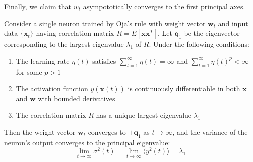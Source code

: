  Finally, we claim that $w_t$ asympototically converges to the first principal axes. 

  \begin{theorem}
    \label{thm:ojas-neuron-convergence-to-first-principal}
    Consider a single neuron trained by \hyperref[thm:ojas-rule]{Oja's rule} with weight vector $\mathbf{w}_t$ and input data $\{\mathbf{x}_t\}$ having correlation matrix $R = E[\mathbf{x}\mathbf{x}^T]$. Let $\mathbf{q}_1$ be the eigenvector corresponding to the largest eigenvalue $\lambda_1$ of $R$. Under the following conditions:
    \begin{enumerate}
      \item The learning rate $\eta(t)$ satisfies $\sum_{t=1}^{\infty} \eta(t) = \infty$ and $\sum_{t=1}^{\infty} \eta(t)^p < \infty$ for some $p > 1$
      \item The activation function $y(\mathbf{x}(t))$ is \hyperref[mv-def:continuously-differentiable]{continuously differentiable} in both $\mathbf{x}$ and $\mathbf{w}$ with bounded derivatives
      \item The correlation matrix $R$ has a unique largest eigenvalue $\lambda_1$
    \end{enumerate}
    Then the weight vector $\mathbf{w}_t$ converges to $\pm\mathbf{q}_1$ as $t \to \infty$, and the variance of the neuron's output converges to the principal eigenvalue:
    \begin{equation}
      \lim_{t \to \infty} \sigma^2(t) = \lim_{t \to \infty} \langle y^2(t) \rangle = \lambda_1
    \end{equation}
  \end{theorem}
